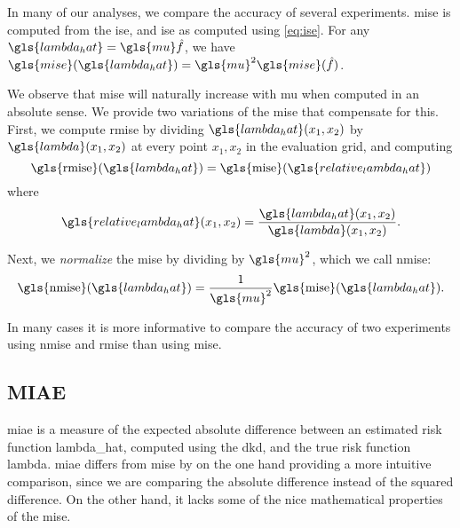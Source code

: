In many of our analyses, we compare the accuracy of several experiments.
\gls{mise} is computed from the \gls{ise},
and \gls{ise} as computed using \cref{eq:ise}.
For any \(\gls{lambda_hat} = \gls{mu} \hat f \),
we have \( \gls{mise}(\gls{lambda_hat}) = \gls{mu}^2 \gls{mise}(\hat f) \).

We observe that \gls{mise} will naturally increase with \gls{mu} when computed in an absolute sense.
We provide two variations of the \gls{mise} that compensate for this.
First, we compute \gls{rmise} by dividing \(\gls{lambda_hat}(x_1, x_2)\) by \(\gls{lambda}(x_1, x_2)\) at every point \(x_1, x_2\) in the evaluation grid, and computing
\begin{equation}
\label{eq:rmise}
    \mbox{\gls{rmise}}(\gls{lambda_hat}) = 
        \mbox{\gls{mise}}(\gls{relative_lambda_hat}) \\
\end{equation}
where
\begin{equation}
\label{eq:relative_lambda_hat}
    \gls{relative_lambda_hat}(x_1, x_2) = 
        \frac{\gls{lambda_hat}(x_1, x_2)}{\gls{lambda}(x_1, x_2)}
        \text{.}
\end{equation}

Next, we \textit{normalize} the \gls{mise} by dividing by \(\gls{mu}^2\),
which we call \gls{nmise}:
\begin{equation}
\label{eq:nmise}
    \mbox{\gls{nmise}}(\gls{lambda_hat}) = 
        \frac{1}{\gls{mu}^2} \mbox{\gls{mise}}(\gls{lambda_hat}) \text{.}
\end{equation}

In many cases it is more informative to compare the accuracy of two experiments using \gls{nmise} and \gls{rmise} than using \gls{mise}.

\subsection{MIAE}
\label{subsec:method:miae}

\Gls{miae} is a measure of the expected absolute difference between an estimated risk function \gls{lambda_hat},
computed using the \gls{dkd}, and the true risk function \gls{lambda}.
\Gls{miae} differs from \gls{mise} by on the one hand providing a more intuitive comparison,
since we are comparing the absolute difference instead of the squared difference.
On the other hand, it lacks some of the nice mathematical properties of the \gls{mise}.

